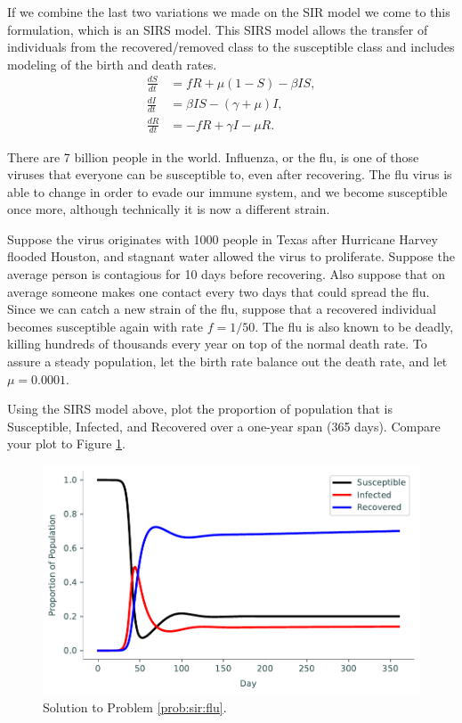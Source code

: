 If we combine the last two variations we made on the SIR model we come to this formulation, which is an SIRS model.
This SIRS model allows the transfer of individuals from the recovered/removed class to the susceptible class and includes modeling of the birth and death rates.
\begin{align}
\frac{dS}{dt} &= fR + \mu(1 -S) - \beta I S,\\
\frac{dI}{dt} &= \beta I S - (\gamma + \mu)I, \\
\frac{dR}{dt} &= -fR + \gamma I - \mu R.
\end{align}

\begin{problem}
\label{prob:sir:flu}
There are 7 billion people in the world.
Influenza, or the flu, is one of those viruses that everyone can be susceptible to, even after recovering.
The flu virus is able to change in order to evade our immune system, and we become susceptible once more, although technically it is now a different strain.

Suppose the virus originates with 1000 people in Texas after Hurricane Harvey flooded Houston, and stagnant water allowed the virus to proliferate.
Suppose the average person is contagious for 10 days before recovering.
Also suppose that on average someone makes one contact every two days that could spread the flu.
Since we can catch a new strain of the flu, suppose that a recovered individual becomes susceptible again with rate $f=1/50$.
The flu is also known to be deadly, killing hundreds of thousands every year on top of the normal death rate.
To assure a steady population, let the birth rate balance out the death rate, and let $\mu=0.0001$.

Using the SIRS model above, plot the proportion of population that is Susceptible, Infected, and Recovered over a one-year span (365 days).
Compare your plot to Figure \ref{fig:sir:flu-sol}.
\end{problem}

\begin{figure}[H]
\centering
\includegraphics[width=\textwidth]{figures/problem3.pdf}
\caption{Solution to Problem \ref{prob:sir:flu}.}
\label{fig:sir:flu-sol}
\end{figure}


